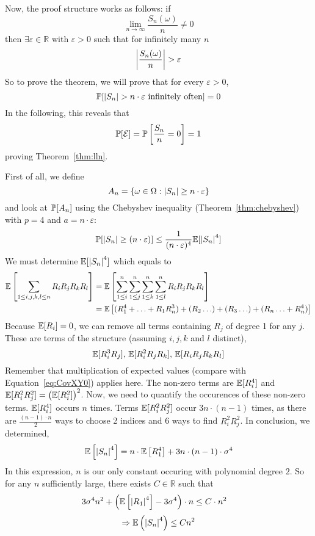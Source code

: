 Now, the proof structure works as follows: if
\[ \lim_{n\to\infty} \frac{S_n(\omega)}{n} \neq 0 \]
then $\exists \varepsilon \in \mathbb R$ with $\varepsilon > 0$ such that for infinitely many $n$
\[ \left\lvert{\frac{S_n(\omega)}{n}}\right\rvert > \varepsilon \]
So to prove the theorem, we will prove that for every $\varepsilon > 0$,
\[ \mathbb P[\left\lvert{S_n}\right\rvert > n \cdot \varepsilon \text{ infinitely often}] = 0 \]
In the following, this reveals that
\[ \mathbb P[\mathcal E] = \mathbb P\left[\frac{S_n}{n} = 0\right] = 1 \]
proving Theorem~\ref{thm:lln}.

First of all, we define
\[ A_n = \left\{\omega \in \Omega: \left\lvert{S_n}\right\rvert \geq n \cdot \varepsilon\right\} \]
and look at $\mathbb P[A_n]$ using the Chebyshev inequality (Theorem~\ref{thm:chebyshev}) with $p=4$ and $a=n\cdot\varepsilon$:
\[ \mathbb P[\left\lvert{S_n}\right\rvert \geq (n\cdot\varepsilon)] \leq \frac{1}{(n\cdot\varepsilon)^4} \mathbb E[\left\lvert{S_n}\right\rvert^4] \]
We must determine $\mathbb E[\left\lvert{S_n}\right\rvert^4]$ which equals to
\begin{align*}
  \mathbb E\left[\sum_{1 \leq i,j,k,l \leq n} R_i R_j R_k R_l\right]
    &= \mathbb E\left[\sum_{1\leq i}^n \sum_{1\leq j}^n \sum_{1\leq k}^n \sum_{1\leq l}^n R_i R_j R_k R_l\right] \notag\\
    &= \mathbb E\left[(R_1^4 + \ldots + R_1 R_n^3) + (R_2 \ldots) + (R_3 \ldots) + (R_n \ldots + R_n^4) \right]
\end{align*}
Because $\mathbb E[R_i] = 0$, we can remove all terms containing $R_j$ of degree 1 for any $j$.
These are terms of the structure (assuming $i, j, k$ and $l$ distinct),
\[
  \mathbb E[R_i^3 R_j], \,
  \mathbb E[R_i^2 R_j R_k], \,
  \mathbb E[R_i R_j R_k R_l]
\]
Remember that multiplication of expected values (compare with Equation~\ref{eq:CovXY0}) applies here.
The non-zero terms are $\mathbb E[R_i^4]$ and $\mathbb E[R_i^2 R_j^2] = \left(\mathbb E[R_i^2]\right)^2$.
Now, we need to quantify the occurences of these non-zero terms. $\mathbb E[R_i^4]$ occurs $n$ times.
Terms $\mathbb E[R_i^2 R_j^2]$ occur $3n \cdot (n-1)$ times, as there are $\frac{(n-1) \cdot n}{2}$ ways to choose 2 indices and 6 ways to find $R_i^2 R_j^2$.
In conclusion, we determined, %
\[ \mathbb E\left[\left\lvert{S_n}\right\rvert^4\right] = n \cdot \mathbb E\left[R_1^4\right] + 3n \cdot (n - 1) \cdot \sigma^4 \]
In this expression, $n$ is our only constant occuring with polynomial degree $2$. So for any $n$ sufficiently large, there exists $C \in \mathbb R$ such that
\begin{align}
  3 \sigma^4 n^2 + \left(\mathbb E\left[\left\lvert{R_1}\right\rvert^4\right] - 3 \sigma^4\right) \cdot n &\leq C \cdot n^2 \label{eq:3sigman2}
\end{align}
\[ \Rightarrow \mathbb E\left(\left\lvert{S_n}\right\rvert^4\right) \leq C n^2 \]

